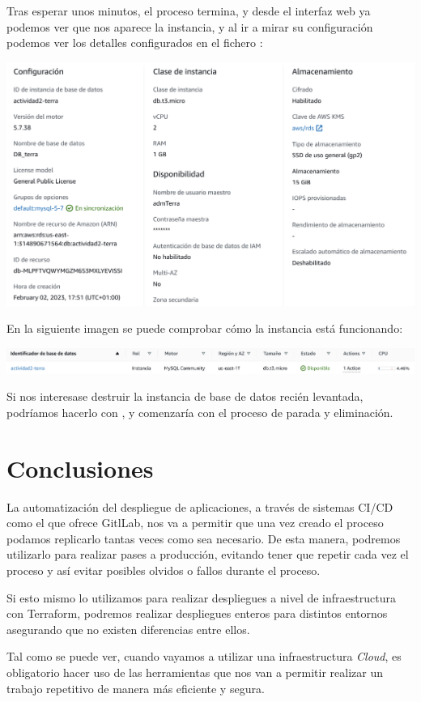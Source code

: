 \documentclass{\ClassPath/viu-tfm-template}
\begin{document}
Tras esperar unos minutos, el proceso termina, y desde el interfaz web ya podemos ver que nos aparece la instancia, y al ir a mirar su configuración podemos ver los detalles configurados en el fichero :


\begin{center}
    \includegraphics[frame,width=\linewidth]{img/terraform2.png}
\end{center}


En la siguiente imagen se puede comprobar cómo la instancia está funcionando:
\begin{center}
    \includegraphics[frame,width=\linewidth]{img/terraform1.png}
\end{center}

Si nos interesase destruir la instancia de base de datos recién levantada, podríamos hacerlo con , y comenzaría con el proceso de parada y eliminación.

\chapter{Conclusiones}

La automatización del despliegue de aplicaciones, a través de sistemas CI/CD como el que ofrece GitlLab, nos va a permitir que una vez creado el proceso podamos replicarlo tantas veces como sea necesario. De esta manera, podremos utilizarlo para realizar pases a producción, evitando tener que repetir cada vez el proceso y así evitar posibles olvidos o fallos durante el proceso.

Si esto mismo lo utilizamos para realizar despliegues a nivel de infraestructura con Terraform, podremos realizar despliegues enteros para distintos entornos asegurando que no existen diferencias entre ellos.

Tal como se puede ver, cuando vayamos a utilizar una infraestructura \textit{Cloud}, es obligatorio hacer uso de las herramientas que nos van a permitir realizar un trabajo repetitivo de manera más eficiente y segura.
\end{document}
